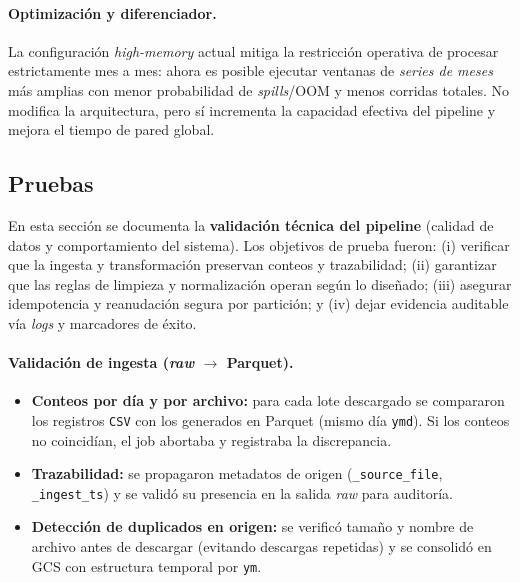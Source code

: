 \documentclass[10pt]{article}
\begin{document}
\paragraph{Optimización y diferenciador.}
La configuración \emph{high-memory} actual mitiga la restricción operativa de procesar estrictamente mes a mes: ahora es posible ejecutar ventanas de \emph{series de meses} más amplias con menor probabilidad de \textit{spills}/OOM y menos corridas totales. No modifica la arquitectura, pero sí incrementa la capacidad efectiva del pipeline y mejora el tiempo de pared global.
\subsection{Pruebas}\label{sec:tests}
\noindent En esta sección se documenta la \textbf{validación técnica del pipeline} (calidad de datos y comportamiento del sistema). Los objetivos de prueba fueron: (i) verificar que la ingesta y transformación preservan conteos y trazabilidad; (ii) garantizar que las reglas de limpieza y normalización operan según lo diseñado; (iii) asegurar idempotencia y reanudación segura por partición; y (iv) dejar evidencia auditable vía \emph{logs} y marcadores de éxito.

\paragraph{Validación de ingesta (\textit{raw} $\rightarrow$ Parquet).}
\begin{itemize}
  \item \textbf{Conteos por día y por archivo:} para cada lote descargado se compararon los registros \texttt{CSV} con los generados en Parquet (mismo día \texttt{ymd}). Si los conteos no coincidían, el job abortaba y registraba la discrepancia.
  \item \textbf{Trazabilidad:} se propagaron metadatos de origen (\texttt{\_source\_file}, \texttt{\_ingest\_ts}) y se validó su presencia en la salida \textit{raw} para auditoría.
  \item \textbf{Detección de duplicados en origen:} se verificó tamaño y nombre de archivo antes de descargar (evitando descargas repetidas) y se consolidó en GCS con estructura temporal por \texttt{ym}.
\end{itemize}
\end{document}
